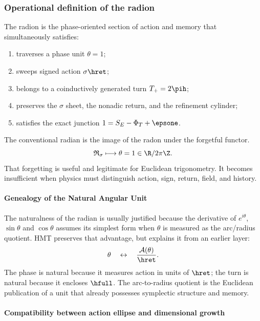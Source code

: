 \subsubsection{Operational definition of the radion}

\begin{definition}
The radion is the phase-oriented section of action and memory that simultaneously satisfies:
\begin{enumerate}
\item traverses a phase unit \(\theta=1\);
\item sweeps signed action \(\sigma\hret\);
\item belongs to a coinductively generated turn \(T_+=2\pih\);
\item preserves the \(\sigma\) sheet, the nonadic return, and the
refinement cylinder;
\item satisfies the exact junction
\(1=S_E-\Phi_T+\epsone\).
\end{enumerate}
\end{definition}

The conventional radian is the image of the radon under the forgetful functor.
\[
\mathfrak R_\sigma
\longmapsto
\theta=1\in\R/2\pi\Z.
\]
That forgetting is useful and legitimate for Euclidean trigonometry. It becomes
insufficient when physics must distinguish action, sign, return,
field, and history.

\paragraph{Genealogy of the Natural Angular Unit}

The naturalness of the radian is usually justified because the derivative of
\(e^{i\theta}\), \(\sin\theta\) and \(\cos\theta\) assumes its simplest form
when \(\theta\) is measured as the arc/radius quotient. HMT preserves that advantage,
but explains it from an earlier layer:
\[
\theta\quad\leftrightarrow\quad
\frac{\mathcal A(\theta)}{\hret}.
\]
The phase is natural because it measures action in units of \(\hret\); the turn is
natural because it encloses \(\hfull\). The arc-to-radius quotient is the
Euclidean publication of a unit that already possesses symplectic structure and memory.

\paragraph{Compatibility between action ellipse and dimensional growth}

